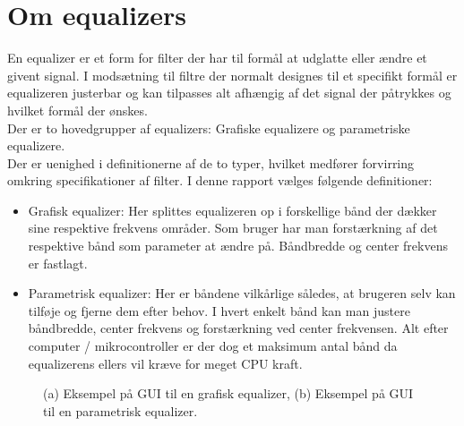 \section{Om equalizers}\label{sec:equalizer}

En equalizer er et form for filter der har til formål at udglatte eller ændre et givent signal. I modsætning til filtre der normalt designes til et specifikt formål er equalizeren justerbar og kan tilpasses alt afhængig af det signal der påtrykkes og hvilket formål der ønskes.\\

Der er to hovedgrupper af equalizers: Grafiske equalizere og parametriske equalizere.\\
Der er uenighed i definitionerne af de to typer, hvilket medfører forvirring omkring specifikationer af filter. I denne rapport vælges følgende definitioner:

\begin{itemize}
	\item Grafisk equalizer: Her splittes equalizeren op i forskellige bånd der dækker sine respektive frekvens områder. Som bruger har man forstærkning af det respektive bånd som parameter at ændre på. Båndbredde og center frekvens er fastlagt.
	\item Parametrisk equalizer: Her er båndene vilkårlige således, at brugeren selv kan tilføje og fjerne dem efter behov. I hvert enkelt bånd kan man justere båndbredde, center frekvens og forstærkning ved center frekvensen. Alt efter computer / mikrocontroller er der dog et maksimum antal bånd da equalizerens ellers vil kræve for meget CPU kraft. 
\end{itemize}  

\begin{figure}[h]
	\centering
  	\caption{(a) Eksempel på GUI til en grafisk equalizer, (b) Eksempel på GUI til en parametrisk equalizer.}
	\label{fig:om_eq}
\end{figure}
\FloatBlock

